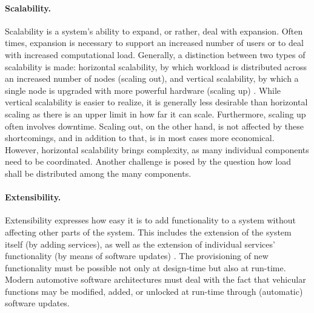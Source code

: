 \paragraph{Scalability.}
Scalability is a system's ability to expand, or rather, deal with expansion. Often times, expansion is necessary to support an increased number of users or to deal with increased computational load. Generally, a distinction between two types of scalability is made: horizontal scalability, by which workload is distributed across an increased number of nodes (scaling out), and vertical scalability, by which a single node is upgraded with more powerful hardware (scaling up) \cite{tanenbaum2017distributed}. While vertical scalability is easier to realize, it is generally less desirable than horizontal scaling as there is an upper limit in how far it can scale. Furthermore, scaling up often involves downtime. Scaling out, on the other hand, is not affected by these shortcomings, and in addition to that, is in most cases more economical. However, horizontal scalability brings complexity, as many individual components need to be coordinated. Another challenge is posed by the question how load shall be distributed among the many components.

\paragraph{Extensibility.}
Extensibility expresses how easy it is to add functionality to a system without affecting other parts of the system. This includes the extension of the system itself (by adding services), as well as the extension of individual services' functionality (by means of software updates) \cite{o2007quality}. The provisioning of new functionality must be possible not only at design-time but also at run-time. Modern automotive software architectures must deal with the fact that vehicular functions may be modified, added, or unlocked at run-time through (automatic) software updates.

